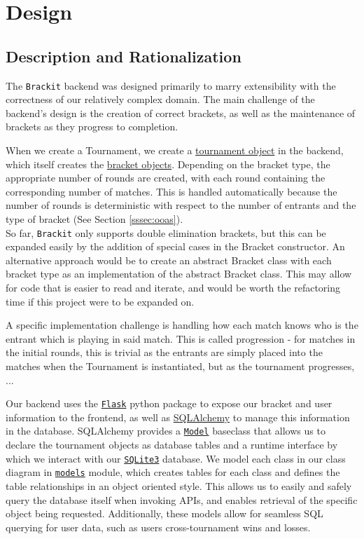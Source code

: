 \documentclass{article}
\begin{document}
\section{Design}
\subsection{Description and Rationalization}
The \texttt{Brackit} backend was designed primarily to marry extensibility with the correctness of 
our relatively complex domain. The main challenge of the backend's design is the creation of 
correct brackets, as well as the maintenance of brackets as they progress to completion.

When we create a Tournament, we create a \href{https://github.com/alextrosta/brackit/blob/master/backend/tournament.py#L18}{tournament object} in the backend, which itself creates
the \href{https://github.com/alextrosta/brackit/blob/master/backend/tournament.py#L59}{bracket objects}. Depending on the bracket type, the appropriate number of rounds are created, 
with each round containing the corresponding number of matches. This is handled automatically because
the number of rounds is deterministic with respect to the number of entrants and the type of bracket (See Section \ref{sssec:ooas}).\\
So far, \texttt{Brackit} only supports double elimination brackets, but this can be expanded easily by the addition of special cases in the Bracket constructor. An alternative approach would be to create an abstract Bracket
class with each bracket type as an implementation of the abstract Bracket class. This may allow for 
code that is easier to read and iterate, and would be worth the refactoring time if this project were 
to be expanded on.

A specific implementation challenge is handling how each match knows who is the entrant which is playing 
in said match. This is called progression - for matches in the initial rounds, this is trivial as 
the entrants are simply placed into the matches when the Tournament is instantiated, but as the tournament
progresses, $\dots$

Our backend uses the \href{https://flask.palletsprojects.com/en/1.1.x/}{\texttt{Flask}} python package to expose our bracket and user information to 
the frontend, as well as \href{https://www.sqlalchemy.org/}{SQLAlchemy} to manage this information in the database. SQLAlchemy provides a \href{https://flask-sqlalchemy.palletsprojects.com/en/2.x/models/}{\texttt{Model}} baseclass that allows us to declare the tournament objects as database tables and a runtime interface by which we interact with our \href{https://www.sqlite.org/index.html}{\texttt{SQLite3}} database. We model each class in our class diagram in \href{https://github.com/alextrosta/brackit/blob/master/backend/app/models.py}{\texttt{models}} module, which creates 
tables for each class and defines the table relationships in an object oriented style. This 
allows us to easily and safely query the database itself when invoking APIs, and enables 
retrieval of the specific object being requested. Additionally, these models allow for 
seamless SQL querying for user data, such as users cross-tournament wins and losses. 
\end{document}
